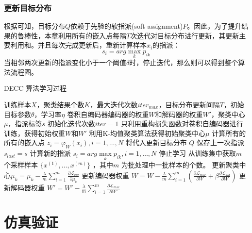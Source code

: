 \subsubsection{更新目标分布}
根据可知，目标分布$Q$依赖于先验的软指派(soft assignment)$P$。因此，为了提升结果的鲁棒性，本章利用所有的嵌入点每隔$T$次迭代对目标分布进行更新，其更新主要利用和。并且每次完成更新后，重新计算样本$x_i$的指派：
\begin{equation}
	s_i=arg \max \limits_k p_{ik}
	\label{equ:assign}
\end{equation}
当相邻两次更新的指派变化小于一个阈值$\delta$时，停止迭代，那么则可以得到整个算法流程图。

\begin{algorithm}[H]
	\caption{DECC 算法学习过程}
	\begin{algorithmic}[1] %
		\Require 训练样本$X$，聚类结果个数$K$，最大迭代次数$iter_{max}$，目标分布更新间隔$T$，初始目标参数$\theta$，学习率$\eta$
		\Ensure 卷积自编码器编码器的权重$W$和解码器的权重$W'$，聚类中心$\mu$，指派标签$s$
		\State 初始化迭代次数$iter=1$
		\State 只利用重构损失函数对卷积自编码器进行训练，获得初始权重$W$和$W'$
		\State 利用K-均值聚类算法获得初始聚类中心$\mu$
				\State 计算所有的所有的嵌入点 $z_i=\varphi_W(x_i),i=1,\dots,N$
				\State 将代入更新目标分布 $Q$
				\State 保存上一次指派$s_{last}=s$
				\State 计算新的指派 $s_i=arg \max \limits_k p_{ik}, i= 1,\dots,N$
					\State 停止学习
				\EndIf
			\EndIf
			\State 从训练集中获取$m$ 个采样样本 $\{x^{(1)},\dots,x^{(m)}\}$ ，其中$m$ 为批处理中一批样本的个数。
			\State 更新聚类中心$\mu_k=\mu_k-\frac{\lambda}{m}\sum_{i=1}^m{\frac{\partial \mathscr{L}_{kld}}{\partial \mu_k}}$
			\State 更新编码器权重 $W=W-\frac{\lambda}{m}\sum_{i=1}^m(\frac{\partial \mathscr{L}_{mse}}{\partial W} + \beta \frac{\partial \mathscr{L}_{kld}}{\partial W})$
			\State 更新解码器权重 $W'=W'-\frac{\lambda}{m}\sum_{i=1}^m{\frac{\partial \mathscr{L}_{mse}}{\partial W'}}$
		\EndWhile
	\end{algorithmic}
\end{algorithm}


\section{仿真验证}

